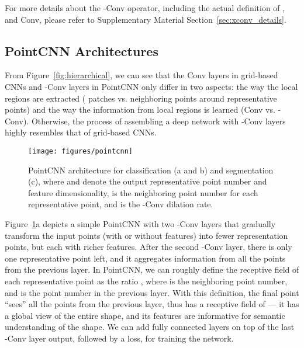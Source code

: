 \documentclass{article}
\begin{document}
For more details about the -Conv operator, including the actual definition of ,  and Conv, please refer to Supplementary Material Section~\ref{sec:xconv_details}.



\subsection{PointCNN Architectures}

From Figure~\ref{fig:hierarchical}, we can see that the Conv layers in grid-based CNNs and -Conv layers in PointCNN only differ in two aspects: the way the local regions are extracted ( patches vs.  neighboring points around representative points) and the way the information from local regions is learned (Conv vs. -Conv). Otherwise, the process of assembling a deep network with -Conv layers highly resembles that of grid-based CNNs.

\begin{figure}[h!]
  \begin{minipage}[c]{0.65\textwidth}
  \texttt{[image: figures/pointcnn]}
  \end{minipage}\hfill
  \begin{minipage}[c]{0.33\textwidth}
	\caption{PointCNN architecture for classification (a and b) and segmentation (c), where  and  denote the output representative point number and feature dimensionality,  is the neighboring point number for each representative point, and  is the -Conv dilation rate.}
	\label{fig:pointcnn}
  \end{minipage}
\end{figure}

Figure~\ref{fig:pointcnn}a depicts a simple PointCNN with two -Conv layers that gradually transform the input points (with or without features) into fewer representation points, but each with richer features. After the second -Conv layer, there is only one representative point left, and it aggregates information from all the points from the previous layer. In PointCNN, we can roughly define the receptive field of each representative point as the ratio , where  is the neighboring point number, and  is the point number in the previous layer. With this definition, the final point ``sees'' all the points from the previous layer, thus has a receptive field of  --- it has a global view of the entire shape, and its features are informative for semantic understanding of the shape. We can add fully connected layers on top of the last -Conv layer output, followed by a loss, for training the network.
\end{document}
